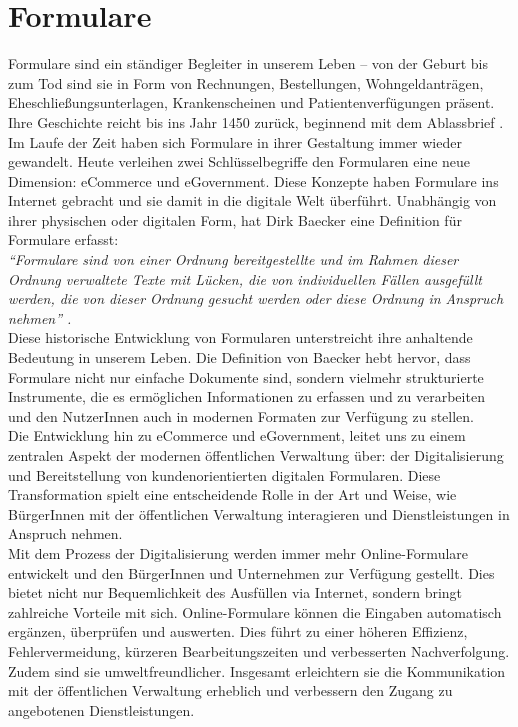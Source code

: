 \section{Formulare}

Formulare sind ein ständiger Begleiter in unserem Leben – von der Geburt bis zum Tod sind sie in Form von Rechnungen, Bestellungen, Wohngeldanträgen, Eheschließungsunterlagen, Krankenscheinen und Patientenverfügungen präsent. Ihre Geschichte reicht bis ins Jahr 1450 zurück, beginnend mit dem Ablassbrief \citep{formulare_schwesinger_2007}. Im Laufe der Zeit haben sich Formulare in ihrer Gestaltung immer wieder gewandelt. Heute verleihen zwei Schlüsselbegriffe den Formularen eine neue Dimension: eCommerce und eGovernment. Diese Konzepte haben Formulare ins Internet gebracht und sie damit in die digitale Welt überführt. Unabhängig von ihrer physischen oder digitalen Form, hat Dirk Baecker eine Definition für Formulare erfasst:\\

\textit{``Formulare sind von einer Ordnung bereitgestellte und im Rahmen dieser Ordnung verwaltete Texte mit Lücken, die von individuellen Fällen ausgefüllt werden, die von dieser Ordnung gesucht werden oder diese Ordnung in Anspruch nehmen'' \citep[S. ~3]{plener_formular_2021}.}\\

Diese historische Entwicklung von Formularen unterstreicht ihre anhaltende Bedeutung in unserem Leben. Die Definition von Baecker hebt hervor, dass Formulare nicht nur einfache Dokumente sind, sondern vielmehr strukturierte Instrumente, die es ermöglichen Informationen zu erfassen und zu verarbeiten und den NutzerInnen auch in modernen Formaten zur Verfügung zu stellen.\\

Die Entwicklung hin zu eCommerce und eGovernment, leitet uns zu einem zentralen Aspekt der modernen öffentlichen Verwaltung über: der Digitalisierung und Bereitstellung von kundenorientierten digitalen Formularen. Diese Transformation spielt eine entscheidende Rolle in der Art und Weise, wie BürgerInnen mit der öffentlichen Verwaltung interagieren und Dienstleistungen in Anspruch nehmen.\\

Mit dem Prozess der Digitalisierung werden immer mehr Online-Formulare entwickelt und den BürgerInnen und Unternehmen zur Verfügung gestellt. Dies bietet nicht nur Bequemlichkeit des Ausfüllen via Internet, sondern bringt zahlreiche Vorteile mit sich. Online-Formulare können die Eingaben automatisch ergänzen, überprüfen und auswerten. Dies führt zu einer höheren Effizienz, Fehlervermeidung, kürzeren Bearbeitungszeiten und verbesserten Nachverfolgung. Zudem sind sie umweltfreundlicher. Insgesamt erleichtern sie die Kommunikation mit der öffentlichen Verwaltung erheblich und verbessern den Zugang zu angebotenen Dienstleistungen.\\


